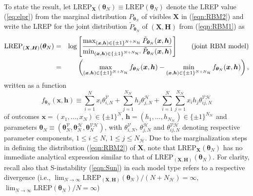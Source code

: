 \documentclass[12pt]{article}
\theoremstyle{definition}
\newcommand{\REP}{\mathrm{LREP}}
\begin{document}
   To state the result,
     let   $\REP_{\boldsymbol X}(\boldsymbol \theta_N) \equiv \REP(\boldsymbol \theta_N) $ denote the LREP value (\ref{eq:elpr}) from the marginal distribution $P_{\boldsymbol \theta_N}$  of visibles $\boldsymbol X$ in (\ref{eqn:RBM2}) and write the LREP  for the joint distribution
   $\tilde{P}_{\boldsymbol \theta_N}$ of  $(\boldsymbol X, \boldsymbol H)$ from   (\ref{eqn:RBM1}) as
         \begin{eqnarray*}
         \REP_{(\boldsymbol X, \boldsymbol H)}(\boldsymbol \theta_N) &=&\log\left[  \frac{\max_{ (\boldsymbol x, \boldsymbol h) \in \{\pm 1\}^{N+N_{\mathcal{H}}}}
         \tilde{P}_{\boldsymbol \theta_N} (\boldsymbol x, \boldsymbol h)}{\min_{ (\boldsymbol x, \boldsymbol h) \in \{\pm 1\}^{N+N_{\mathcal{H}}}`}
         \tilde{P}_{\boldsymbol \theta_N} (\boldsymbol x, \boldsymbol h)} \right] \qquad \mbox{(joint RBM model)}    \\    &= &  \left(\max_{ (\boldsymbol x, \boldsymbol h) \in \{\pm 1\}^{N+N_{\mathcal{H}}}} f_{\boldsymbol \theta_N} (\boldsymbol x, \boldsymbol h)-\min_{ (\boldsymbol x, \boldsymbol h) \in \{\pm 1\}^{N+N_{\mathcal{H}}}} f_{\boldsymbol \theta_N} (\boldsymbol x, \boldsymbol h)\right),
          \end{eqnarray*}
 written as a function \begin{equation}
 \label{eqn:f}
           f_{\boldsymbol \theta_N} (\boldsymbol x, \boldsymbol h)  \equiv  \sum_{i=1}^N x_i  \theta_{i,N}^{\mathcal{V}} +  \sum_{j=1}^{N_\mathcal{H}} h_j \theta_{j,N}^{\mathcal{H}}  + \sum_{i=1}^N \sum_{j=1}^{N_\mathcal{H}} x_i h_j  \theta_{ij,N}^{\mathcal{VH}}  \end{equation}
  of outcomes $\boldsymbol x =(x_1,\ldots,x_N) \in\{\pm1\}^{N}$, $\boldsymbol h =(h_1,\ldots,h_{N_{\mathcal{H}}})  \in\{\pm1\}^{N_{\mathcal{H}}}$ and parameters $\boldsymbol \theta_N \equiv (\boldsymbol \theta_N^{\mathcal{V}},\boldsymbol \theta_N^{\mathcal{H}}, \boldsymbol \theta_N^{\mathcal{VH}}  )$, with
  $\theta_{i,N}^{\mathcal{V}}$, $\theta_{j,N}^{\mathcal{H}}$ and $\theta_{ij,N}^{\mathcal{VH}}$ denoting respective parameter components,  $1 \leq i \leq N$, $1 \leq j \leq N_{\mathcal{H}}$.  Due to the marginalization steps in defining the distribution (\ref{eqn:RBM2}) of $\boldsymbol X$, note that $\REP_{\boldsymbol X}(\boldsymbol \theta_N)$ has no immediate analytical expression similar to that of  $\REP_{(\boldsymbol X, \boldsymbol H)}(\boldsymbol \theta_N)$.  For clarity, recall also that S-instability (\ref{eqn:Sun}) in each model type
refers to a respective divergence (i.e., $\lim_{N\to \infty} \REP_{(\boldsymbol X, \boldsymbol H)}(\boldsymbol \theta_N) /(N+N_{\mathcal{H}})=\infty$, $\lim_{N\to \infty} \REP(\boldsymbol \theta_N) /N=\infty$)
\end{document}
